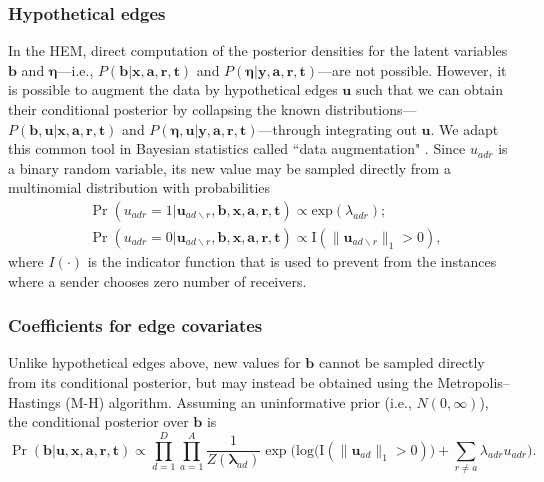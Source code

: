 \documentclass[ba]{imsart}
\numberwithin{equation}{section}
\theoremstyle{plain}
\begin{document}
\subsubsection{Hypothetical edges}
In the HEM, direct computation of the posterior densities for the latent variables $\boldsymbol{b}$ and $\boldsymbol{\eta}$---i.e., $P(\boldsymbol{b}|\boldsymbol{x},\boldsymbol{a}, \boldsymbol{r},\boldsymbol{t})$ and $P(\boldsymbol{\eta}|\boldsymbol{y},\boldsymbol{a}, \boldsymbol{r},\boldsymbol{t})$---are not possible. However, it is possible to augment the data by hypothetical edges $\boldsymbol{u}$ such that we can obtain their conditional posterior by collapsing the known distributions---$P(\boldsymbol{b}, \boldsymbol{u}|\boldsymbol{x},\boldsymbol{a}, \boldsymbol{r},\boldsymbol{t})$ and $P(\boldsymbol{\eta}, \boldsymbol{u}| \boldsymbol{y},\boldsymbol{a}, \boldsymbol{r},\boldsymbol{t})$---through integrating out $\boldsymbol{u}$. We adapt this common tool in Bayesian statistics called ``data augmentation" \citep{tanner1987calculation,neal2015exact}. Since $u_{adr}$ is a binary random variable, its new value may be sampled directly from a multinomial distribution with probabilities
\begin{equation}
\begin{aligned}
&\Pr(u_{adr}=1| \boldsymbol{u}_{ad\backslash r}, \boldsymbol{b}, \boldsymbol{x},\boldsymbol{a}, \boldsymbol{r},\boldsymbol{t})
\propto \mbox{exp}(\lambda_{adr});\\
&\Pr(u_{adr}=0| \boldsymbol{u}_{ad\backslash r},\boldsymbol{b}, \boldsymbol{x},\boldsymbol{a}, \boldsymbol{r},\boldsymbol{t})\propto \text{I}(\lVert\boldsymbol{u}_{ad\backslash r}\rVert_1 > 0 ),
\end{aligned}
\label{eqn:latentreceiver}
\end{equation}
where $I(\cdot)$ is the indicator function that is used to prevent from the instances where a sender chooses zero number of receivers. 
\subsubsection{Coefficients for edge covariates}
Unlike hypothetical edges above, new values for $\boldsymbol{b}$ cannot be sampled directly from its conditional posterior, but may instead be obtained using the Metropolis--Hastings (M-H) algorithm. Assuming an uninformative prior (i.e., $N({0},\infty)$), the conditional posterior over $\boldsymbol{b}$ is
\begin{equation}
\Pr(\boldsymbol{b}| \boldsymbol{u}, \boldsymbol{x}, \boldsymbol{a}, \boldsymbol{r},\boldsymbol{t})\propto \prod_{d=1}^D
\prod_{a=1}^A \frac{1}{Z(\boldsymbol{\lambda}_{ad})}\exp\Big(\mbox{log}\big(\text{I}( \lVert \boldsymbol{u}_{ad}\rVert_1 > 0)\big) + \sum\limits_{r \neq a} \lambda_{adr}u_{adr}\Big).
\label{eqn:latentedge}
\end{equation}
\end{document}
